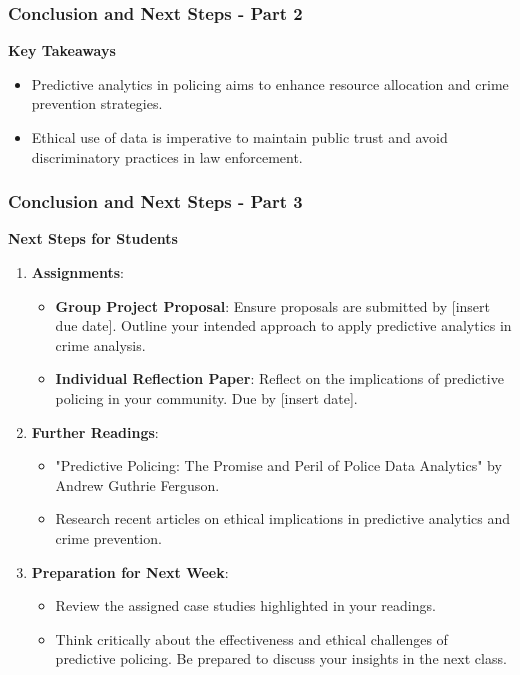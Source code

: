 \documentclass[aspectratio=169]{beamer}
\begin{document}
\begin{frame}[fragile]
    \frametitle{Conclusion and Next Steps - Part 2}
    
    \textbf{Key Takeaways}
    
    \begin{itemize}
        \item Predictive analytics in policing aims to enhance resource allocation and crime prevention strategies.
        \item Ethical use of data is imperative to maintain public trust and avoid discriminatory practices in law enforcement.
    \end{itemize}
\end{frame}

\begin{frame}[fragile]
    \frametitle{Conclusion and Next Steps - Part 3}
    
    \textbf{Next Steps for Students}
    
    \begin{enumerate}
        \item \textbf{Assignments}:
        \begin{itemize}
            \item \textbf{Group Project Proposal}: Ensure proposals are submitted by [insert due date]. Outline your intended approach to apply predictive analytics in crime analysis.
            \item \textbf{Individual Reflection Paper}: Reflect on the implications of predictive policing in your community. Due by [insert date]. 
        \end{itemize}
        
        \item \textbf{Further Readings}:
        \begin{itemize}
            \item "Predictive Policing: The Promise and Peril of Police Data Analytics" by Andrew Guthrie Ferguson.
            \item Research recent articles on ethical implications in predictive analytics and crime prevention.
        \end{itemize}
        
        \item \textbf{Preparation for Next Week}:
        \begin{itemize}
            \item Review the assigned case studies highlighted in your readings.
            \item Think critically about the effectiveness and ethical challenges of predictive policing. Be prepared to discuss your insights in the next class.
        \end{itemize}
    \end{enumerate}
\end{frame}
\end{document}
